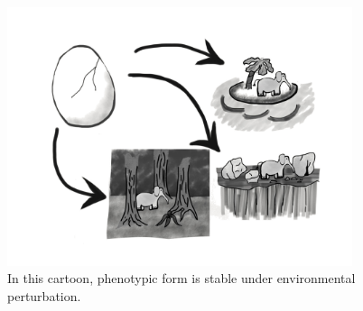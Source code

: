 \begin{figure}
\begin{columns}
\begin{column}{0.65\textwidth}
\includegraphics[width=\textwidth,trim={2cm 10cm 2cm 7cm},clip]{img/elephant_developmental_perturbation}
\end{column}
\begin{column}{0.3\textwidth}
  \caption{In this cartoon, phenotypic form is stable under environmental perturbation.}
  \end{column}
 \begin{column}{0.05\textwidth}
 \end{column}
 \end{columns}
  \label{fig:elephant_developmental_perturbation}
\end{figure}